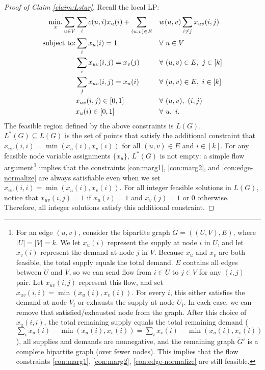 \Lstarclaim*
\begin{proof}[Proof of Claim \ref{claim:Lstar}]
Recall the local LP:
\begin{alignat}{2}
  \mindot_{x}\sum_{u\in V}&\sum_i c(u,i)x_u(i) + \sum_{(u,v) \in E}&&w(u,v)\sum_{i\ne j}x_{uv}(i,j)\\
  \text{subject to:}& \sum_{i}x_u(i) = 1 &&\forall\ u\in V\label{con:norm}\\
                    & \sum_{i}x_{uv}(i,j) = x_v(j)&& \forall\ (u,v)\in E,\ j\in [k]\label{con:marg1}\\
                   & \sum_{j}x_{uv}(i,j) = x_u(i)&& \forall\ (u,v)\in E,\ i\in [k]\label{con:marg2}\\
                   & x_{uv}(i,j) \in [0,1]&&\forall\ (u,v),\ (i,j)\label{con:edge-normalize}\\
                   & x_{u}(i) \in [0,1]&& \forall\ u,\ i.
\end{alignat}
The feasible region defined by the above constraints is $L(G)$. $L^*(G) \subseteq L(G)$ is the set of points that satisfy the additional constraint that $x_{uv}(i,i) = \min(x_u(i), x_v(i))$ for all $(u,v) \in E$ and $i \in [k]$. For any feasible node variable assignments $\{x_u\}$, $L^*(G)$ is not empty: a simple flow argument\footnote{For an edge $(u,v)$, consider the bipartite graph $\tilde{G} = ((U,V), E)$, where $|U| = |V| = k$. We let $x_u(i)$ represent the supply at node $i$ in $U$, and let $x_v(i)$ represent the demand at node $j$ in $V$. Because $x_u$ and $x_v$ are both feasible, the total supply equals the total demand. $E$ contains all edges between $U$ and $V$, so we can send flow from $i\in U$ to $j \in V$ for any $(i,j)$ pair. Let $x_{uv}(i,j)$ represent this flow, and set $x_{uv}(i,i) = \min(x_u(i), x_v(i))$. For every $i$, this either satisfies the demand at node $V_i$ or exhausts the supply at node $U_i$. In each case, we can remove that satisfied/exhausted node from the graph. After this choice of $x_u(i,i)$, the total remaining supply equals the total remaining demand ($\sum_i x_u(i) - \min(x_u(i),x_v(i)) = \sum_i x_v(i) - \min(x_u(i),x_v(i))$), all supplies and demands are nonnegative, and the remaining graph $\tilde{G}'$ is a complete bipartite graph (over fewer nodes). This implies that the flow constraints \eqref{con:marg1}, \eqref{con:marg2}, \eqref{con:edge-normalize} are still feasible.}
implies that the constraints \eqref{con:marg1}, \eqref{con:marg2}, and \eqref{con:edge-normalize} are always satisfiable even when we set $x_{uv}(i,i) = \min(x_u(i), x_v(i))$. 
For all integer feasible solutions in $L(G)$, notice that $x_{uv}(i,j) = 1$ if $x_u(i) = 1$ and $x_v(j) = 1$ or $0$ otherwise. Therefore, all integer solutions satisfy this additional constraint.

\end{proof}
